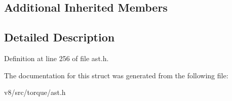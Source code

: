 \subsection*{Additional Inherited Members}


\subsection{Detailed Description}


Definition at line 256 of file ast.\+h.



The documentation for this struct was generated from the following file\+:\begin{DoxyCompactItemize}
\item 
v8/src/torque/ast.\+h\end{DoxyCompactItemize}
